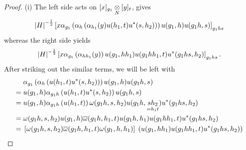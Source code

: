 \begin{proof}
	(i) The left side acts on $ [x]_{g_1} \underset{N}{\otimes} [y]_t $, gives
	\begin{align*}
		\left|{H}\right |^{- \frac 1 2} \left[x \alpha_{g_1} \left(\alpha_h \left(\alpha_{h_1} (y) u(h_1 ,t) u^*(s,h_2)\right)\right) u(g_1,h) u(g_1 h , s) \right]_{g_1h s}
	\end{align*}
	whereas the right side yields
	\[
	\left|{H}\right |^{- \frac 1 2} \left[x \alpha_{g_1} \left(\alpha_{h h_1} (y) \right) u(g_1 , hh_1) u(g_1 h h_1, t)  u^*(g_1 h s , h_2) \right]_{g_1h s}.
	\]
	After striking out the similar terms, we will be left with
	\begin{align*}
		& \; \alpha_{g_1} \left(\alpha_h \left( u(h_1 ,t) u^*(s,h_2)\right)\right) u(g_1,h) u(g_1 h , s)\\
		= & \; u(g_1,h) \alpha_{g_1 h} \left( u(h_1 ,t) u^*(s,h_2)\right)  u(g_1 h , s)\\
		= & \;  u(g_1,h) \alpha_{g_1 h} \left( u(h_1 ,t) \right) \omega (g_1 h , s , h_2) u(g_1h, \underset{=h_1 t}{s h_2}) u^* (g_1 h s ,h_2) \\
		= & \; \omega (g_1 h , s , h_2) u(g_1,h) \overline{\omega} (g_1 h , h_1 ,t) u(g_1 h, h_1) u(g_1h h_1 , t) u^* (g_1 h s ,h_2) \\
		= & \; \left[\omega (g_1 h , s , h_2) \overline{\omega} (g_1 h , h_1 ,t) \omega (g_1 ,  h,h_1)\right] \; \left( u(g_1 , hh_1) u(g_1 h h_1, t)  u^*(g_1 h s , h_2) \right)
	\end{align*}
	

\end{proof}
